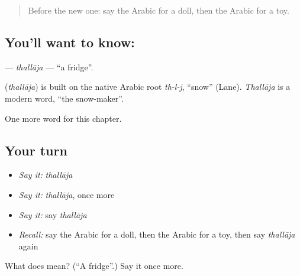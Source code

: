 \label{lesson:AR-C126-thallaja}



\begin{quote}
Before the new one: say the Arabic for a doll, then the Arabic for a toy.
\end{quote}

\subsection*{You'll want to know: }
\textbf{} — \emph{thallāja} — \textquotedblleft{}a fridge\textquotedblright{}.

\begin{cousinweb}
\textbf{} (\emph{thallāja}) is built on the native Arabic root \emph{th-l-j}, \textquotedblleft{}snow\textquotedblright{} (Lane). \emph{Thallāja} is a modern word, \textquotedblleft{}the snow-maker\textquotedblright{}.
\end{cousinweb}

\begin{grammarlens}[title={What you've built}]
One more word for this chapter.
\end{grammarlens}

\subsection*{Your turn}
\begin{itemize}
\raggedright
  \item \emph{Say it:} \emph{thallāja}
  \item \emph{Say it:} \emph{thallāja}, once more
  \item \emph{Say it:} say \emph{thallāja}
  \item \emph{Recall:} say the Arabic for a doll, then the Arabic for a toy, then say \emph{thallāja} again
\end{itemize}

\begin{tcolorbox}[breakable,colback=teal!4,colframe=teal!35!black,title={Before you move on}]
What does  mean? (\textquotedblleft{}A fridge\textquotedblright{}.) Say it once more.
\end{tcolorbox}
